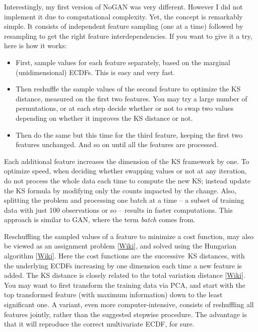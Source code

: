 \documentclass[oneside,10pt]{book}
\begin{document}
Interestingly, my first version of NoGAN was very different. However I did not implement it due to computational complexity. Yet, the concept is remarkably simple. It consists of independent feature sampling (one at a time) followed by resampling to get the right feature interdependencies. If you want to give it a try, here is how it works: \vspace{1ex}
\begin{itemize}
\item First, sample values for each feature separately, based on the marginal (unidimensional) ECDFs. This is easy and very fast.
\item Then reshuffle the sample values of the second feature to optimize the KS distance, measured on the first two features.
 You may try a large number of permutations,  or at each step decide whether or not to swap two values depending on whether it improves the KS distance or not.
\item Then do the same but this time for the third feature, keeping the first two features unchanged. And so on until all the features are processed.
\end{itemize}\vspace{1ex}
Each additional feature increases the
 dimension of the KS framework by one. To optimize speed, when deciding whether swapping values or not at any iteration, do not process the whole data each time to compute the new KS; instead update the KS formula by modifying
 only the counts impacted by the change. Also, splitting the problem and processing one \textcolor{index}{batch} at a time -- a subset of training data with just 100 observations or so -- results in faster computations. This approach is similar to GAN, where the term {\em batch} comes from.

Reschuffling the sampled values of a feature to minimize a cost function, may also be viewed as an \textcolor{index}{assignment problem} [\href{https://en.wikipedia.org/wiki/Assignment_problem}{Wiki}], and solved using the \textcolor{index}{Hungarian algorithm} [\href{https://en.wikipedia.org/wiki/Hungarian_algorithm}{Wiki}]. Here the cost functions are the successive~KS distances, with the underlying ECDFs increasing by one dimension each time a new feature is added.  The KS
 distance is closely related to the \textcolor{index}{total variation distance}
 [\href{https://en.wikipedia.org/wiki/Total_variation_distance_of_probability_measures}{Wiki}].
You may want to first transform the training data via PCA, and start with the top transformed feature (with maximum
 information) down to the least significant one.
 A variant, even more computer-intensive, consists of reshuffling all features jointly, rather than the suggested stepwise procedure. The advantage is that it will reproduce the correct multivariate ECDF, for sure.
\end{document}
